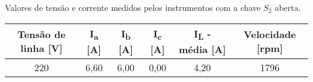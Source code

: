 \documentclass[a4paper,12pt,oneside]{article}
\begin{document}
\begin{center}
\renewcommand{\arraystretch}{1.5}
\captionsetup{type=table}
\caption{Valores de tensão e corrente medidos pelos instrumentos com a chave $S_2$ aberta.}\vspace{2mm}
\begin{tabular}{c|c|c|c|c|c}\label{tab:resultados2}
\textbf{Tensão de linha [V]} & \textbf{I\textsubscript{a} [A]} & \textbf{I\textsubscript{b} [A]} & \textbf{I\textsubscript{c} [A]} & \textbf{I\textsubscript{L} - média [A]} & \textbf{Velocidade [rpm]}\\ \hline
220 & 6,60 & 6,00 & 0,00 & 4,20 & 1796\\ \hline
\end{tabular}
\end{center}

\newpage
\end{document}
